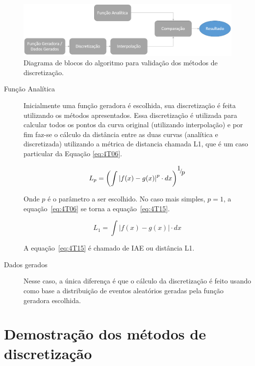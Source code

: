 \begin{figure}[H]
	\begin{center}
     	\includegraphics[width=0.6\linewidth]{./figuras/algoritmo1}
		\caption{Diagrama de blocos do algoritmo para validação dos métodos de discretização.}\label{fig:08}
	\end{center}
\end{figure}


\begin{description}
	\item[Função Analítica] Inicialmente uma função geradora é escolhida, sua discretização é feita utilizando os métodos apresentados. Essa discretização é utilizada para calcular todos os pontos da curva original (utilizando interpolação) e por fim faz-se o cálculo da distância entre as duas curvas (analítica e discretizada) utilizando a métrica de distancia chamada L1, que é um caso particular da Equação \eqref{eq:4T06}.
	
	\begin{equation}\label{eq:4T06}
	{L_p} = {\left( {\int {{{\left| {f(x) - g(x)} \right|}^p}}\cdot dx } \right)^{{\raise0.7ex\hbox{$1$} \!\mathord{\left/
					{\vphantom {1 p}}\right.\kern-\nulldelimiterspace}
				\!\lower0.7ex\hbox{$p$}}}}
	\end{equation}
	
	Onde $p$ é o parâmetro a ser escolhido. No caso mais simples, $p=1$, a equação~\eqref{eq:4T06} se torna a equação~\eqref{eq:4T15}.
	
	\begin{equation}\label{eq:4T15}
	{L_1} = {\int {\left| {f(x) - g(x)} \right|} \cdot dx}
	\end{equation}
	
	A equação~\eqref{eq:4T15} é chamado de \ac{IAE} ou distância L1.
	
	\item[Dados gerados] Nesse caso, a única diferença é que o cálculo da discretização é feito usando como base a distribuição de eventos aleatórios geradas pela função geradora escolhida.
\end{description}


\section{Demostração dos métodos de discretização}

